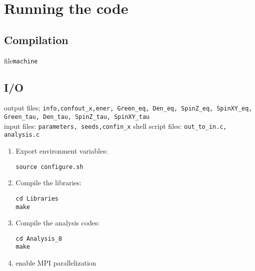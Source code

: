 \section{Running the code}\label{sec:io}



\subsection{Compilation}
file\texttt{machine} 
\subsection{I/O}
output files; \texttt{info,confout\_x,ener, Green\_eq, Den\_eq, SpinZ\_eq, SpinXY\_eq, Green\_tau, Den\_tau, SpinZ\_tau, SpinXY\_tau}\\
input files: \texttt{parameters, seeds,confin\_x}
shell script files: \texttt{out\_to\_in.c, analysis.c}



\begin{enumerate}
\item Export  environment variables:
\begin{verbatim}
source configure.sh
\end{verbatim}
\item Compile the libraries: 
\begin{verbatim}
cd Libraries
make
\end{verbatim}
\item Compile the analysis codes: 
\begin{verbatim}
cd Analysis_8
make
\end{verbatim}
\item enable MPI parallelization

\end{enumerate}

